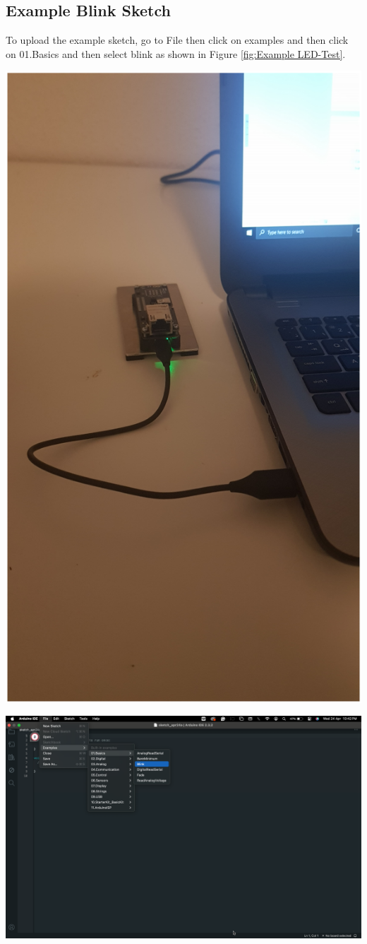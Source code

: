 	
	\subsection{Example Blink Sketch}
	
	To upload the example sketch, go to File then click on examples and then click on 01.Basics and then select blink as shown in Figure \ref{fig:Example LED-Test}.
	
	\begin{center}
		\label{fig:Arduino PortentaH7 Connected to a Laptop}
		\includegraphics[width=0.7\linewidth]{images/ArduinoIDE/ArduinoPortentaH7Connectedtoalaptop.png}
	\end{center}
	
	\begin{center}
		\label{fig:Example LED-Test}
		\includegraphics[width=0.7\linewidth]{images/ArduinoIDE/MenuBarOptions.png}
	\end{center}
	
